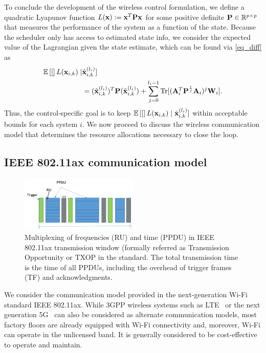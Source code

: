To conclude the development of the wireless control formulation, we define a quadratic Lyapunov function $L({\mathbf x}) := {\mathbf x}^T {\mathbf P} {\mathbf x}$ for some positive definite ${\mathbf P} \in {\mathbb R}^{p \times p}$ that measures the performance of the system as a function of the state. Because the scheduler only has access to estimated state info, we consider the expected value of the Lagrangian given the state estimate, which can be found via \eqref{eq_diff} as
%
\begin{align}
\E [L(\bbx_{i,k}) \mid &\hbx^{(l_i)}_{i,k}]  \label{eq_perf} \\
&=  (\hbx^{(l_i)}_{i,k})^T \bbP (\hbx^{(l_i)}_{i,k}) + \sum_{j=0}^{l_i-1} \Tr[(\bbA_i^T\bbP^{\frac{1}{j}}\bbA_i)^{j} \bbW_i]. \nonumber
\end{align}
%
Thus, the control-specific goal is to keep ${\mathbb E}\left[[\right]L({\mathbf x}_{i,k}) \mid {\hat{\ensuremath{\mathbf x}} }^{(l_i)}_{i,k}]$ within acceptable bounds for each system $i$. We now proceed to discuss the wireless communication model that determines the resource allocations necessary to close the loop.

\subsection{IEEE 802.11ax communication model}\label{sec_comm_model}

\begin{figure}
%
\includegraphics[width=0.5\textwidth]{images/schedule2.png}
\caption{Multiplexing of frequencies (RU) and time (PPDU) in IEEE 802.11ax transmission window (formally referred as Transmission Opportunity or TXOP in the standard. The total transmission time is the time of all PPDUs, including the overhead of trigger frames (TF) and acknowledgments.}
\label{fig_multiplex}
\end{figure}

We consider the communication model provided in the next-generation Wi-Fi standard IEEE 802.11ax. While 3GPP wireless systems such as LTE~\cite{sesia2011lte} or the next generation 5G~\cite{agiwal2016next} can also be considered as alternate communication models, most factory floors are already equipped with Wi-Fi connectivity and, moreover, Wi-Fi can operate in the unlicensed band. It is generally considered to be cost-effective to operate and maintain.

